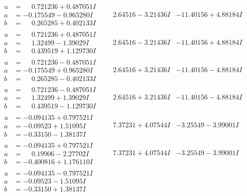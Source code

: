 \documentclass[1p]{elsarticle_modified}
\theoremstyle{definition}
\begin{document}
$$\begin{array}{c|c|c}
\begin{aligned}
u &= \phantom{-}0.721236 + 0.487051 I \\
a &= -0.175549 - 0.965280 I \\
b &= \phantom{-}0.265285 + 0.402133 I\end{aligned}
 & \phantom{-}2.64516 - 3.21436 I & -11.40156 + 4.88184 I \\ \hline\begin{aligned}
u &= \phantom{-}0.721236 + 0.487051 I \\
a &= \phantom{-}1.32499 - 1.39029 I \\
b &= \phantom{-}0.439519 + 1.129730 I\end{aligned}
 & \phantom{-}2.64516 - 3.21436 I & -11.40156 + 4.88184 I \\ \hline\begin{aligned}
u &= \phantom{-}0.721236 - 0.487051 I \\
a &= -0.175549 + 0.965280 I \\
b &= \phantom{-}0.265285 - 0.402133 I\end{aligned}
 & \phantom{-}2.64516 + 3.21436 I & -11.40156 - 4.88184 I \\ \hline\begin{aligned}
u &= \phantom{-}0.721236 - 0.487051 I \\
a &= \phantom{-}1.32499 + 1.39029 I \\
b &= \phantom{-}0.439519 - 1.129730 I\end{aligned}
 & \phantom{-}2.64516 + 3.21436 I & -11.40156 - 4.88184 I \\ \hline\begin{aligned}
u &= -0.094135 + 0.797521 I \\
a &= -0.09523 + 1.51095 I \\
b &= -0.33150 - 1.38137 I\end{aligned}
 & \phantom{-}7.37231 + 4.07544 I & -3.25549 - 3.99001 I \\ \hline\begin{aligned}
u &= -0.094135 + 0.797521 I \\
a &= \phantom{-}0.19906 - 2.27702 I \\
b &= -0.400816 + 1.176110 I\end{aligned}
 & \phantom{-}7.37231 + 4.07544 I & -3.25549 - 3.99001 I \\ \hline\begin{aligned}
u &= -0.094135 - 0.797521 I \\
a &= -0.09523 - 1.51095 I \\
b &= -0.33150 + 1.38137 I\end{aligned}

\end{array}$$
\end{document}
